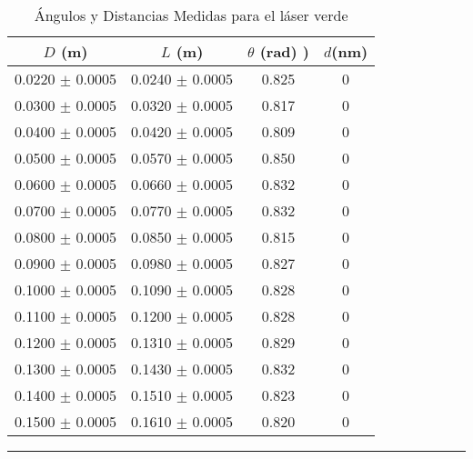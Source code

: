 \documentclass[10pt,a4paper]{article}
\begin{document}
	\begin{table}[H]
		\centering
		\begin{tabular}{|c|c|c|c|}
			\hline
			$D$ (m) & $L$ (m) & $\theta$ (rad) )&  $d$(nm) \\ \hline
			0.0220 $\pm$ 0.0005  & 0.0240 $\pm$ 0.0005 &  0.825  & 0 \\
			0.0300 $\pm$ 0.0005  & 0.0320 $\pm$ 0.0005 &  0.817  & 0\\
			0.0400 $\pm$ 0.0005  & 0.0420 $\pm$ 0.0005 &  0.809  & 0\\ 
			0.0500 $\pm$ 0.0005 & 0.0570 $\pm$ 0.0005 & 0.850  & 0\\ 
			0.0600 $\pm$ 0.0005 & 0.0660 $\pm$ 0.0005 & 0.832 &  0\\ 
			0.0700 $\pm$ 0.0005 & 0.0770 $\pm$ 0.0005 & 0.832  & 0 \\
			0.0800 $\pm$ 0.0005  & 0.0850 $\pm$ 0.0005 &  0.815 & 0 \\ 
			0.0900 $\pm$ 0.0005 & 0.0980 $\pm$ 0.0005 &  0.827  & 0 \\
			0.1000 $\pm$ 0.0005 & 0.1090 $\pm$ 0.0005 &  0.828 & 0  \\
			0.1100 $\pm$ 0.0005 & 0.1200 $\pm$ 0.0005 &  0.828  & 0 \\
			0.1200 $\pm$ 0.0005 & 0.1310 $\pm$ 0.0005 &  0.829  & 0  \\
			0.1300 $\pm$ 0.0005 & 0.1430 $\pm$ 0.0005 &  0.832 & 0 \\
			0.1400 $\pm$ 0.0005 & 0.1510 $\pm$ 0.0005 &  0.823 & 0  \\
			0.1500 $\pm$ 0.0005 & 0.1610 $\pm$ 0.0005 &  0.820 & 0  \\ \hline
			
		\end{tabular}
		\caption{Ángulos y Distancias Medidas para el láser verde}
		\label{tab:angulos_distancias.}
		\rule{100mm}{0.1mm}
	\end{table}
\end{document}
